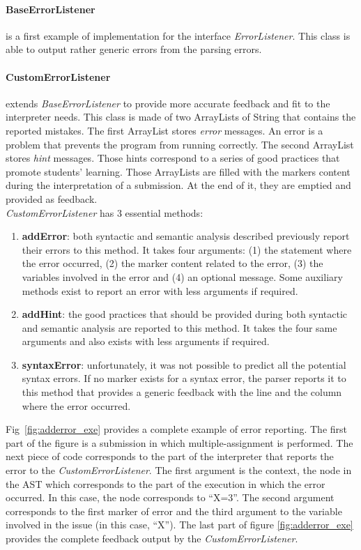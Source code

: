 \documentclass[11pt,a4paper,twoside,openright]{report}
\begin{document}
\paragraph{BaseErrorListener}
is a first example of implementation for the interface \textit{ErrorListener}. 
This class is able to output rather generic errors from the parsing errors.

\paragraph{CustomErrorListener}
extends \textit{BaseErrorListener} to provide more accurate feedback and fit 
to the interpreter needs. This class is made of two ArrayLists of String that 
contains the reported mistakes. The first ArrayList stores \textit{error} 
messages. An error is a problem that prevents the program from running 
correctly. The second ArrayList stores \textit{hint} messages. Those hints 
correspond to a series of good practices that promote students' learning. Those 
ArrayLists are filled with the markers content during the interpretation of a 
submission. At the end of it, they are emptied and provided as feedback.\\

\textit{CustomErrorListener} has 3 essential methods:
\begin{enumerate}
 \item \textbf{addError}: both syntactic and semantic analysis described 
previously report their errors to this method. It takes four arguments: 
(1) the statement where the error occurred, (2) the marker content related to 
the error, (3) the variables involved in the error and (4) an optional message. 
Some auxiliary methods exist to report an error with less arguments if required.
 \item \textbf{addHint}: the good practices that should be provided during both 
syntactic and semantic analysis are reported to this method. It takes the four 
same arguments and also exists with less arguments if required.
 \item \textbf{syntaxError}: unfortunately, it was not possible to 
predict all the potential syntax errors. If no marker exists for a syntax 
error, the parser reports it to this method that provides a generic 
feedback with the line and the column where the error occurred.
\end{enumerate}

Fig~\ref{fig:adderror_exe} provides a complete example of error reporting. The 
first part of the figure is a submission in which multiple-assignment is 
performed. The next piece of code corresponds to the part of the interpreter 
that reports the error to the \textit{CustomErrorListener}. The first argument 
is the context, the node in the AST which corresponds to the part of the 
execution in which the error occurred. In this case, the node corresponds to 
\enquote{X=3}. The second argument corresponds to the first marker of error and 
the third argument to the variable involved in the issue (in this case, 
\enquote{X}). The last part of figure \ref{fig:adderror_exe} provides the complete feedback output 
by the \textit{CustomErrorListener}.\\
\end{document}
